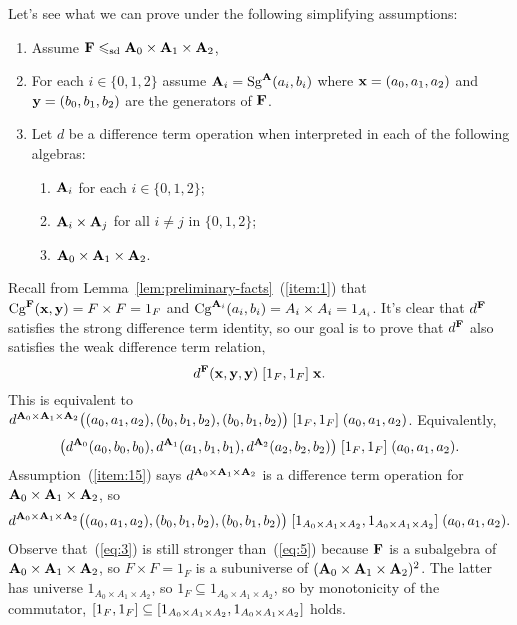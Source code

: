 Let's see what we can prove under the following
simplifying assumptions:
\begin{enumerate}
\item Assume $\mathbf{F} \leqslant_{\mathrm{sd}} \mathbf{A}_0 \times \mathbf{A}_1 \times \mathbf{A}_2$,
\item For each $i\in \{0,1,2\}$ assume $\mathbf{A}_i = \operatorname{Sg}^{\mathbf{A}}(a_i, b_i)$ where
  $\mathbf{x} = (a_0,a_1,a_2)$ and $\mathbf{y} = (b_0,b_1,b_2)$ are the generators of $\mathbf{F}$.
\item Let $d$ be a difference term operation when interpreted in
  each of the following algebras:
\begin{enumerate}
  \item \label{item:13} $\mathbf{A}_i$ for each $i\in \{0,1,2\}$;
  \item \label{item:14}$\mathbf{A}_i\times \mathbf{A}_j$ for all $i \neq j$ in $\{0,1,2\}$;
  \item \label{item:15} $\mathbf{A}_0\times \mathbf{A}_1 \times \mathbf{A}_2$.
\end{enumerate}
\end{enumerate}

Recall from Lemma~\ref{lem:preliminary-facts}~(\ref{item:1}) that
$\operatorname{Cg}^{\mathbf{F}}(\mathbf{x}, \mathbf{y}) = F\times F = 1_F$ and
$\operatorname{Cg}^{\mathbf{A}_i}(a_i, b_i) = A_i \times A_i = 1_{A_i}$.
It's clear that $d^{\mathbf{F}}$ satisfies the strong difference term identity, so 
our goal is to prove that $d^{\mathbf{F}}$ also satisfies the weak difference term relation,
\begin{equation}
  \label{eq:3}  
  d^{\mathbf{F}}(\mathbf{x}, \mathbf{y}, \mathbf{y}) \mathrel{[1_F, 1_F]} \mathbf{x}.
\end{equation}
This is equivalent to $d^{\mathbf{A}_0\times \mathbf{A}_1 \times \mathbf{A}_2}\bigl((a_0, a_1, a_2), (b_0, b_1, b_2), (b_0, b_1, b_2)\bigr) \mathrel{[1_{F}, 1_{F}]} (a_0, a_1, a_2)$.
Equivalently, %
\begin{equation*}
\bigl(d^{\mathbf{A}_0}(a_0, b_0, b_0), d^{\mathbf{A}_1}(a_1, b_1, b_1), d^{\mathbf{A}_2}(a_2, b_2, b_2)\bigr)
 \mathrel{[1_F, 1_F]} (a_0, a_1, a_2).
\end{equation*}
Assumption~(\ref{item:15}) says
$d^{\mathbf{A}_0\times \mathbf{A}_1 \times \mathbf{A}_2}$ is a difference term operation for 
$\mathbf{A}_0\times \mathbf{A}_1 \times \mathbf{A}_2$, so
\begin{equation}
    \label{eq:5}
  d^{\mathbf{A}_0\times \mathbf{A}_1 \times \mathbf{A}_2}\bigl((a_0, a_1, a_2), (b_0, b_1, b_2), (b_0, b_1, b_2)\bigr)
  \mathrel{[1_{A_0\times A_1\times A_2}, 1_{A_0\times A_1\times A_2}]} (a_0, a_1, a_2).
\end{equation}
Observe that~(\ref{eq:3}) is still stronger than~(\ref{eq:5})
because $\mathbf{F}$ is a subalgebra of $\mathbf{A}_0\times \mathbf{A}_1 \times \mathbf{A}_2$, so 
$F \times F = 1_F$ is a subuniverse of
$(\mathbf{A}_0 \times \mathbf{A}_1 \times \mathbf{A}_2)^2$.  The latter has universe
$1_{A_0 \times A_1 \times A_2}$, so
$1_F \subseteq 1_{A_0 \times A_1 \times A_2}$, so by monotonicity of the commutator,
$[1_F, 1_F] \subseteq [1_{A_0\times A_1\times A_2}, 1_{A_0\times A_1\times A_2}]$ holds.

